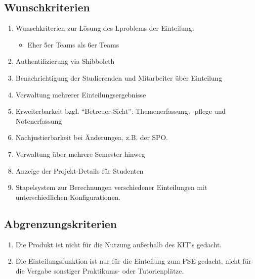 \documentclass[parskip=full]{scrartcl}
\begin{document}
\subsection{Wunschkriterien}
\begin{enumerate}[{W}1]
    \item Wunschkriterien zur Lösung des Lproblems der Einteilung:
    \begin{itemize}
        \item Eher 5er Teams als 6er Teams
    \end{itemize}    
    
    \item Authentifizierung via Shibboleth

    \item Benachrichtigung der Studierenden und Mitarbeiter über Einteilung

    \item Verwaltung mehrerer Einteilungsergebnisse

    \item  Erweiterbarkeit bzgl. “Betreuer-Sicht”: Themenerfassung, -pflege und Notenerfassung
    
    \item Nachjustierbarkeit bei Änderungen, z.B. der SPO.
    
    \item Verwaltung über mehrere Semester hinweg
    
    \item Anzeige der Projekt-Details für Studenten
    
    \item Stapelsystem zur Berechnungen verschiedener Einteilungen mit unterschiedlichen Konfigurationen.
    
    
\end{enumerate}

\subsection{Abgrenzungskriterien}
\begin{enumerate}[{A}1]
 
  \item Die Produkt ist nicht für die Nutzung außerhalb des KIT's gedacht.

\item Die Einteilungsfunktion ist nur für die Einteilung zum PSE gedacht, nicht
für die Vergabe sonstiger Praktikums- oder Tutorienplätze.
  
\end{enumerate}
\end{document}
